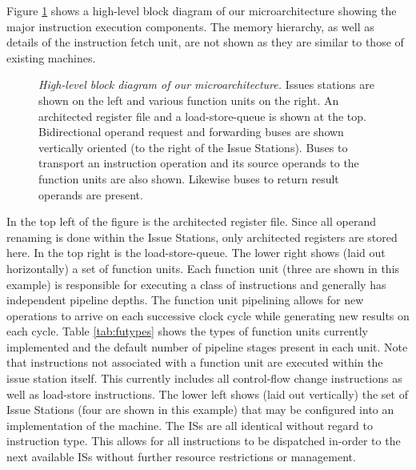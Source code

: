 \documentclass[10pt,dvips]{article}
\begin{document}
Figure \ref{fig:overview} shows a high-level block diagram
of our microarchitecture showing the major instruction execution components.
The memory hierarchy, as well as details of the instruction fetch
unit, are not shown as they are similar to those of existing
machines.
%
\begin{figure}
\centering
{}
\caption{{\em High-level block diagram of our microarchitecture.} 
Issues stations are shown on the left and various function
units on the right.  An architected register file and a
load-store-queue is shown at the top.
Bidirectional operand request and forwarding buses are shown
vertically oriented (to the right of the Issue Stations).
Buses to transport an instruction operation and its source operands
to the function units are also shown. 
Likewise buses to return result operands are present.}
\label{fig:overview}
\end{figure}
%
In the top left of the figure is the architected register file.
Since all operand renaming is done within the Issue Stations,
only architected registers are stored here.
In the top right is the load-store-queue.
The lower right shows (laid out horizontally) a set of function units.
Each function unit (three are shown in this example)
is responsible for executing a class of
instructions and generally has independent pipeline depths.
The function unit pipelining allows for new operations to arrive
on each successive clock cycle while generating new results on
each cycle.
Table \ref{tab:futypes} shows the types of function units
currently implemented and the default number of pipeline stages
present in each unit.
Note that instructions not associated with a function unit
are executed within the issue station itself.  This currently
includes all control-flow change instructions as well as load-store
instructions.  
The lower left shows (laid out vertically) the set of
Issue Stations (four are shown in this example)
that may be configured into an implementation of
the machine.
The ISs are all identical without regard to 
instruction type.  This allows for all instructions to be
dispatched in-order to the next available ISs 
without further resource restrictions or management.
%
%
\end{document}
